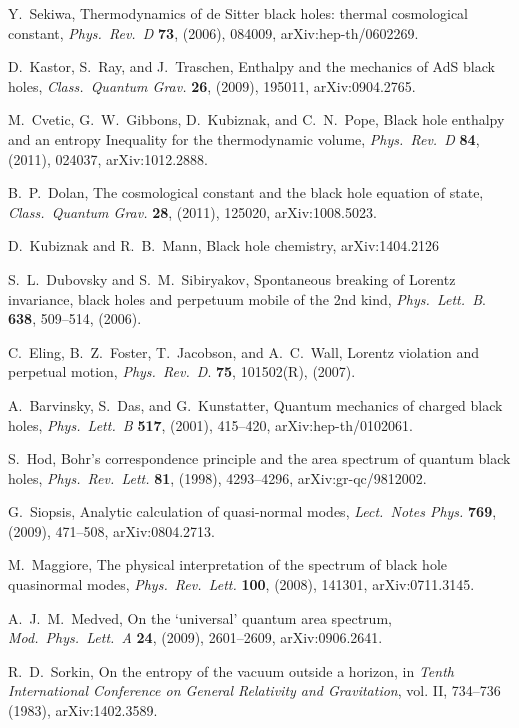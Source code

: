 \documentclass[11pt]{article}
\begin{document}
\begin{thebibliography}{999}
 Y.\ Sekiwa, Thermodynamics of de Sitter black
 holes: thermal cosmological constant, \emph{Phys.\ Rev.\ D}
{\bf 73}, (2006), 084009, arXiv:hep-th/0602269.

 D.\ Kastor, S.\ Ray, and J.\ Traschen, Enthalpy and 
the mechanics of AdS black holes, \emph{Class.\ Quantum Grav.}
{\bf 26}, (2009), 195011, arXiv:0904.2765.

 M.\ Cvetic, G.~W.\ Gibbons, D.\ Kubiznak, and
C.~N.\ Pope, Black hole enthalpy and an entropy Inequality for the 
thermodynamic volume, \emph{Phys.\ Rev.\ D} {\bf 84}, (2011),
024037, arXiv:1012.2888.

 B.~P.\ Dolan, The cosmological constant and 
the black hole equation of state, \emph{Class.\ Quantum Grav.}
{\bf 28}, (2011), 125020, arXiv:1008.5023.

  D.\ Kubiznak and R.~B.\ Mann, Black hole
chemistry, arXiv:1404.2126

 S.~L.\ Dubovsky and S.~M.\ Sibiryakov, Spontaneous
breaking of Lorentz invariance, black holes and perpetuum mobile of
the 2nd kind, \emph{Phys.\ Lett.\ B}. {\bf 638}, 509--514, (2006).

 C.\ Eling, B.~Z.\ Foster, T.\ Jacobson, and A.~C.\ Wall,
Lorentz violation and perpetual motion, \emph{Phys.\ Rev.\ D}. {\bf 75},
101502(R), (2007).

 A.\ Barvinsky, S.\ Das, and G.\ Kunstatter,
Quantum mechanics of charged black holes, \emph{Phys.\ Lett.\ B}
{\bf 517}, (2001), 415--420, arXiv:hep-th/0102061.

 S.\ Hod, Bohr's correspondence principle and the 
area spectrum of quantum black holes, \emph{Phys.\ Rev.\ Lett.}
{\bf 81}, (1998), 4293--4296, arXiv:gr-qc/9812002.

 G.\ Siopsis, Analytic calculation of quasi-normal 
modes, \emph{Lect.\ Notes Phys.} {\bf 769}, (2009), 471--508,
arXiv:0804.2713.

 M.\ Maggiore, The physical interpretation of 
the spectrum of black hole quasinormal modes, \emph{Phys.\ 
Rev.\ Lett.} {\bf 100}, (2008), 141301, arXiv:0711.3145.

 A.~J.~M.\ Medved, On the `universal' quantum 
area spectrum, \emph{Mod.\ Phys.\ Lett.\ A} {\bf 24}, (2009), 
2601--2609, arXiv:0906.2641.

 R.~D.\ Sorkin, On the entropy of the vacuum outside 
a horizon, in \emph{Tenth International Conference on General Relativity 
and Gravitation}, vol. II, 734--736 (1983), arXiv:1402.3589.


\end{thebibliography}
\end{document}
